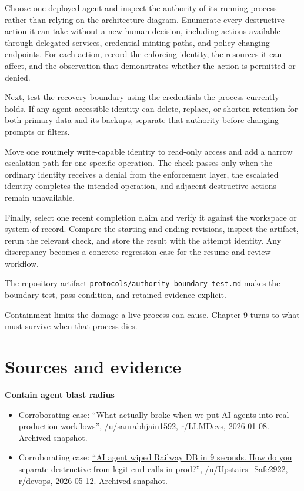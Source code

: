 Choose one deployed agent and inspect the authority of its running process rather than relying on the architecture diagram. Enumerate every destructive action it can take without a new human decision, including actions available through delegated services, credential-minting paths, and policy-changing endpoints. For each action, record the enforcing identity, the resources it can affect, and the observation that demonstrates whether the action is permitted or denied.

Next, test the recovery boundary using the credentials the process currently holds. If any agent-accessible identity can delete, replace, or shorten retention for both primary data and its backups, separate that authority before changing prompts or filters.

Move one routinely write-capable identity to read-only access and add a narrow escalation path for one specific operation. The check passes only when the ordinary identity receives a denial from the enforcement layer, the escalated identity completes the intended operation, and adjacent destructive actions remain unavailable.

Finally, select one recent completion claim and verify it against the workspace or system of record. Compare the starting and ending revisions, inspect the artifact, rerun the relevant check, and store the result with the attempt identity. Any discrepancy becomes a concrete regression case for the resume and review workflow.

The repository artifact \href{https://github.com/sjarmak/engineering-reliable-coding-agents/blob/main/protocols/authority-boundary-test.md}{\texttt{protocols/authority-boundary-test.md}} makes the boundary test, pass condition, and retained evidence explicit.

Containment limits the damage a live process can cause. Chapter 9 turns to what must survive when that process dies.

\section*{Sources and evidence}

\textbf{Contain agent blast radius}

\begin{itemize}
\tightlist
\item
  Corroborating case: \href{https://www.reddit.com/r/LLMDevs/comments/1q7avil/}{``What actually broke when we put AI agents into real production workflows''}, /u/saurabhjain1592, r/LLMDevs, 2026-01-08. \href{https://web.archive.org/web/20260806014103/https://www.reddit.com/r/LLMDevs/comments/1q7avil/what_actually_broke_when_we_put_ai_agents_into/}{Archived snapshot}.
\item
  Corroborating case: \href{https://www.reddit.com/r/devops/comments/1tbbls4/}{``AI agent wiped Railway DB in 9 seconds. How do you separate destructive from legit curl calls in prod?''}, /u/Upstairs\_Safe2922, r/devops, 2026-05-12. \href{https://web.archive.org/web/20260806014121/https://www.reddit.com/r/devops/comments/1tbbls4/ai_agent_wiped_railway_db_in_9_seconds_how_do_you/}{Archived snapshot}.
\end{itemize}

